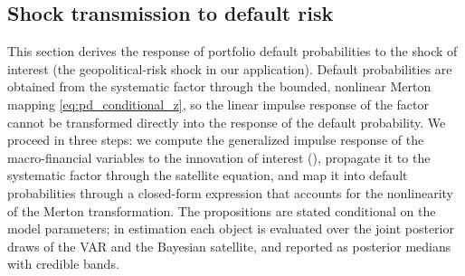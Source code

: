 \subsection{Shock transmission to default risk}\label{sec:irf_transmission}
This section derives the response of portfolio default probabilities to the shock
of interest (the geopolitical-risk shock in our application). Default
probabilities are obtained from the systematic factor through the bounded,
nonlinear Merton mapping \eqref{eq:pd_conditional_z}, so the linear impulse
response of the factor cannot be transformed directly into the response of the
default probability. We proceed in three steps: we compute the generalized
impulse response of the macro-financial variables to the innovation of interest
(\citealp{koop1996impulse}), propagate it to the systematic factor through the
satellite equation, and map it into default probabilities through a closed-form
expression that accounts for the nonlinearity of the Merton transformation. The
propositions are stated conditional on the model parameters; in estimation each
object is evaluated over the joint posterior draws of the VAR and the Bayesian
satellite, and reported as posterior medians with credible bands.
